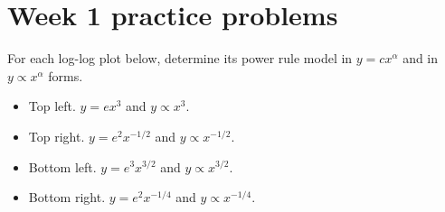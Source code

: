 \documentclass[../main.tex]{subfiles}
\begin{document}
\section{Week 1 practice problems}

\begin{exercise}
  For each log-log plot below, determine its power rule model in \(y = c x^{\alpha}\) and in \(y \propto x^{\alpha}\) forms.

  \hfill

  \hfill

  \begin{solution}
    \phantom{top}

    \begin{itemize}
      \item Top left.  \(y = e x^{3}\) and \(y \propto x^{3}\).

      \item Top right. \(y = e^{2} x^{-1/2}\) and \(y \propto x^{-1/2}\).

      \item Bottom left. \(y = e^{3} x^{3/2}\) and \(y \propto x^{3/2}\).

      \item Bottom right. \(y = e^{2} x^{-1/4}\) and \(y \propto x^{-1/4}\).
    \end{itemize}
  \end{solution}
\end{exercise}
\end{document}
